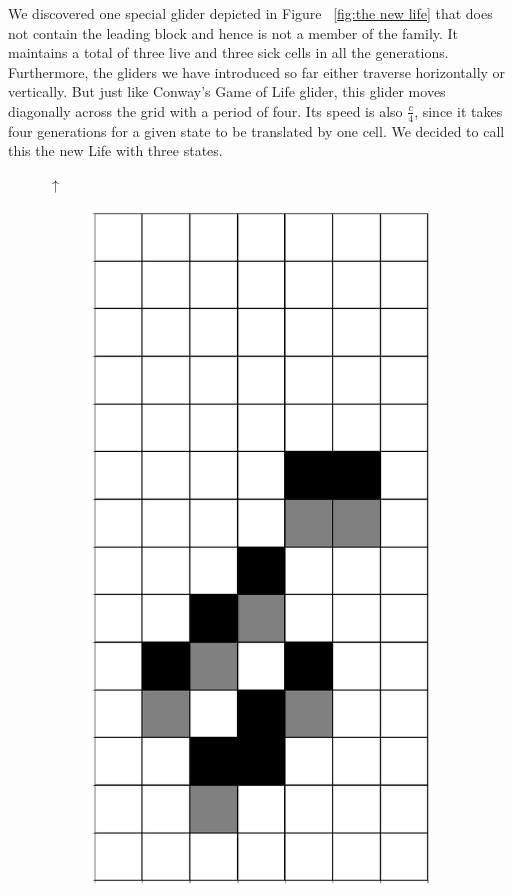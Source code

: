\documentclass[12pt]{article}
\numberwithin{figure}{section} %
\begin{document}
We discovered one special glider depicted in Figure ~\ref{fig:the new life} that does not contain the leading block and hence is not a member of the family. It maintains a total of three live and three sick cells in all the generations. Furthermore, the gliders we have introduced so far either traverse horizontally or vertically. But just like Conway’s Game of Life glider, this glider moves diagonally across the grid with a period of four. Its speed is also $\frac{c}{4}$, since it takes four generations for a given state to be translated by one cell. We decided to call this the new Life with three states.
\begin{figure}[H]
\begin{center}
{\Huge$\uparrow$}
\end{center}
 \begin{subfigure}{0.19\textwidth}
     \centering
     \includegraphics[width=\linewidth]{Section4/15.0}

\end{subfigure}
\end{figure}
\end{document}
